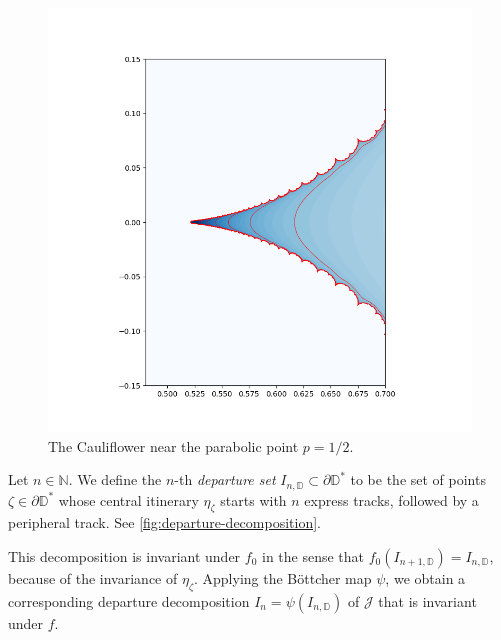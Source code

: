 \begin{figure}
    \centering
    \includegraphics[width=\textwidth]{figures/cauliflower_equipotentials2.png}
    \caption{The Cauliflower near the parabolic point $p=1/2$.}
    \label{fig:my_figure}
\end{figure}

\begin{definition}

Let $n \in \mathbb N$. We define the $n$-th \emph{departure set} $I_{n, \mathbb D} \subset \partial \mathbb D ^*$ to be the set of points $\zeta \in \partial \mathbb D^*$ whose central itinerary $\eta_{\zeta}$ starts with $n$ express tracks, followed by a peripheral track.
See \cref{fig:departure-decomposition}.
\end{definition}

This decomposition is invariant under $f_0$ in the sense that $f_0(I_{n+1, \mathbb D})=I_{n, \mathbb D}$, because of the invariance of $\eta _\zeta$.
Applying the Böttcher map $\psi$, we obtain a corresponding departure decomposition $I_n = \psi(I_{n, \mathbb D})$ of $\mathcal J$ that is invariant under $f$.

